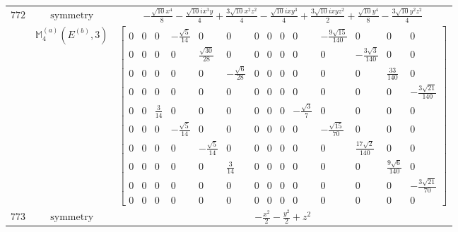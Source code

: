 \documentclass[fleqn,8pt,landscape]{jsarticle}
\begin{document}
\begin{longtable}{ccc}
$ 772 $ & $ \text{symmetry} $ & $ - \frac{\sqrt{10} x^{4}}{8} - \frac{\sqrt{10} i x^{3} y}{4} + \frac{3 \sqrt{10} x^{2} z^{2}}{4} - \frac{\sqrt{10} i x y^{3}}{4} + \frac{3 \sqrt{10} i x y z^{2}}{2} + \frac{\sqrt{10} y^{4}}{8} - \frac{3 \sqrt{10} y^{2} z^{2}}{4} $ \\
$  $ & $ \mathbb{M}_{4}^{(a)}(E^{(b)},3) $ & $ \begin{bmatrix} 0 & 0 & 0 & - \frac{\sqrt{5}}{14} & 0 & 0 & 0 & 0 & 0 & 0 & - \frac{9 \sqrt{15}}{140} & 0 & 0 & 0 \\ 0 & 0 & 0 & 0 & \frac{\sqrt{30}}{28} & 0 & 0 & 0 & 0 & 0 & 0 & - \frac{3 \sqrt{3}}{140} & 0 & 0 \\ 0 & 0 & 0 & 0 & 0 & - \frac{\sqrt{6}}{28} & 0 & 0 & 0 & 0 & 0 & 0 & \frac{33}{140} & 0 \\ 0 & 0 & 0 & 0 & 0 & 0 & 0 & 0 & 0 & 0 & 0 & 0 & 0 & - \frac{3 \sqrt{21}}{140} \\ 0 & 0 & \frac{3}{14} & 0 & 0 & 0 & 0 & 0 & 0 & - \frac{\sqrt{3}}{7} & 0 & 0 & 0 & 0 \\ 0 & 0 & 0 & - \frac{\sqrt{5}}{14} & 0 & 0 & 0 & 0 & 0 & 0 & - \frac{\sqrt{15}}{70} & 0 & 0 & 0 \\ 0 & 0 & 0 & 0 & - \frac{\sqrt{5}}{14} & 0 & 0 & 0 & 0 & 0 & 0 & \frac{17 \sqrt{2}}{140} & 0 & 0 \\ 0 & 0 & 0 & 0 & 0 & \frac{3}{14} & 0 & 0 & 0 & 0 & 0 & 0 & \frac{9 \sqrt{6}}{140} & 0 \\ 0 & 0 & 0 & 0 & 0 & 0 & 0 & 0 & 0 & 0 & 0 & 0 & 0 & - \frac{3 \sqrt{21}}{70} \\ 0 & 0 & 0 & 0 & 0 & 0 & 0 & 0 & 0 & 0 & 0 & 0 & 0 & 0 \end{bmatrix} $ \\ \hline
$ 773 $ & $ \text{symmetry} $ & $ - \frac{x^{2}}{2} - \frac{y^{2}}{2} + z^{2} $ \\

\end{longtable}
\end{document}
